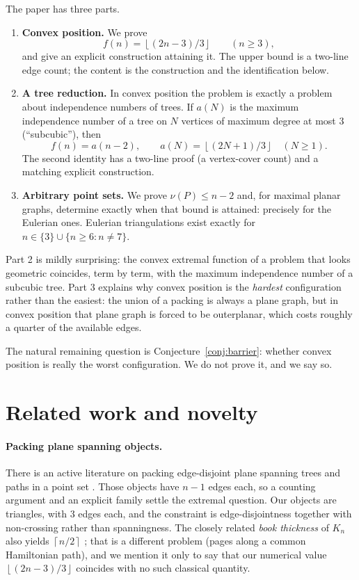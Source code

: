 \documentclass[11pt]{article}
\theoremstyle{plain}
\theoremstyle{definition}
\theoremstyle{remark}
\newcommand{\Floor}[1]{\left\lfloor #1\right\rfloor}
\newcommand{\Ceil}[1]{\left\lceil #1\right\rceil}
\begin{document}
The paper has three parts.

\begin{enumerate}
\item \textbf{Convex position.}  We prove
  \[
  f(n)=\Floor{(2n-3)/3}\qquad(n\ge 3),
  \]
  and give an explicit construction attaining it.  The upper bound is a two-line edge
  count; the content is the construction and the identification below.
\item \textbf{A tree reduction.}  In convex position the problem is exactly a problem
  about independence numbers of trees.  If $a(N)$ is the maximum independence number of a
  tree on $N$ vertices of maximum degree at most $3$ (``subcubic''), then
  \[
  f(n)=a(n-2),\qquad a(N)=\Floor{(2N+1)/3}\quad(N\ge 1).
  \]
  The second identity has a two-line proof (a vertex-cover count) and a matching explicit
  construction.
\item \textbf{Arbitrary point sets.}  We prove $\nu(P)\le n-2$ and, for maximal planar
  graphs, determine exactly when that bound is attained: precisely for the Eulerian ones.
  Eulerian triangulations exist exactly for $n\in\{3\}\cup\{n\ge 6: n\ne 7\}$.
\end{enumerate}

Part 2 is mildly surprising: the convex extremal function of a problem that looks
geometric coincides, term by term, with the maximum independence number of a subcubic
tree.  Part 3 explains why convex position is the \emph{hardest} configuration rather than
the easiest: the union of a packing is always a plane graph, but in convex position that
plane graph is forced to be outerplanar, which costs roughly a quarter of the available
edges.

The natural remaining question is Conjecture~\ref{conj:barrier}: whether convex position is
really the worst configuration.  We do not prove it, and we say so.

\section{Related work and novelty}

\paragraph{Packing plane spanning objects.}
There is an active literature on packing edge-disjoint plane spanning trees and paths in a
point set \cite{aichholzer2017}.  Those objects have $n-1$ edges each, so a counting
argument and an explicit family settle the extremal question.  Our objects are triangles,
with $3$ edges each, and the constraint is edge-disjointness together with non-crossing
rather than spanningness.  The closely related \emph{book thickness} of $K_n$ also yields
$\Ceil{n/2}$ \cite{bernhartkainen1979}; that is a different problem (pages along a common
Hamiltonian path), and we mention it only to say that our numerical value
$\Floor{(2n-3)/3}$ coincides with no such classical quantity.
\end{document}
